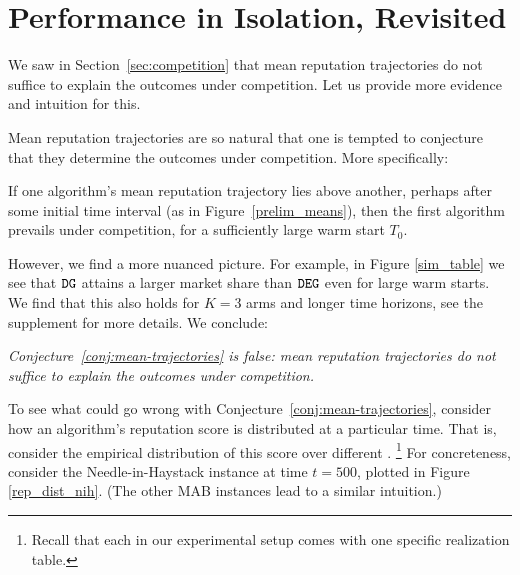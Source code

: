 \documentclass[../competing_bandits_with_appendix.tex]{subfiles}
\begin{document}
\section{Performance in Isolation, Revisited}\label{sec:revisited}

We saw in Section~\ref{sec:competition} that mean reputation trajectories do not suffice to explain the outcomes under competition. Let us provide more evidence and intuition for this.

Mean reputation trajectories are so natural that one is tempted to conjecture that they determine the outcomes under competition. More specifically:
\begin{conjecture}\label{conj:mean-trajectories}
If one algorithm's mean reputation trajectory lies above another, perhaps after some initial time interval (\eg as in Figure~\ref{prelim_means}), then the first algorithm prevails under competition, for a sufficiently large warm start $T_0$.
\end{conjecture}

However, we find a more nuanced picture. For example, in Figure \ref{sim_table} we see that $\mathtt{DG}$ attains a larger market share than $\mathtt{DEG}$ even for large warm starts. We find that this also holds for $K = 3$ arms and longer time horizons, see the supplement for more details. We conclude:


\begin{finding}
\textit{
Conjecture~\ref{conj:mean-trajectories} is false: mean reputation trajectories do not suffice to explain the outcomes under competition.}
\end{finding}

To see what could go wrong with Conjecture~\ref{conj:mean-trajectories}, consider how an algorithm's reputation score is distributed at a particular time. That is, consider the empirical distribution of this score over different \MRVs.%
\footnote{Recall that each \MRV in our experimental setup comes with one specific realization table.} For concreteness, consider the Needle-in-Haystack instance at time $t=500$, plotted in Figure \ref{rep_dist_nih}. (The other MAB instances lead to a similar intuition.)
\end{document}
